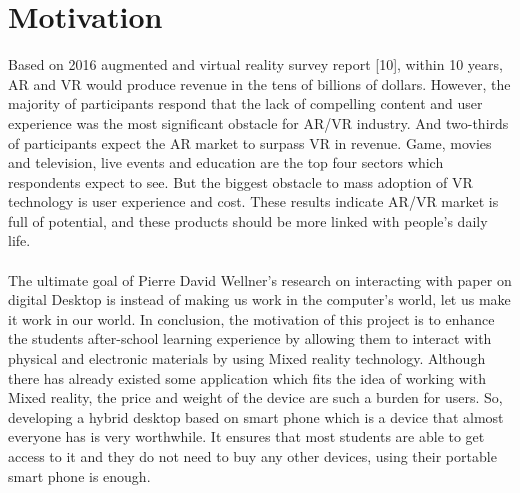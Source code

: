 
\chapter{Motivation} %

\label{Chapter2} %
Based on 2016 augmented and virtual reality survey report [10], within 10 years, AR and VR would produce revenue in the tens of billions of dollars. However, the majority of participants respond that the lack of compelling content and user experience was the most significant obstacle for AR/VR industry. And two-thirds of participants expect the AR market to surpass VR in revenue. Game, movies and television, live events and education are the top four sectors which respondents expect to see. But the biggest obstacle to mass adoption of VR technology is user experience and cost. These results indicate AR/VR market is full of potential, and these products should be more linked with people’s daily life.
\\
\\
The ultimate goal of Pierre David Wellner’s research on interacting with paper on digital Desktop is instead of making us work in the computer’s world, let us make it work in our world. In conclusion, the motivation of this project is to enhance the students after-school learning experience by allowing them to interact with physical and electronic materials by using Mixed reality technology. Although there has already existed some application which fits the idea of working with Mixed reality, the price and weight of the device are such a burden for users. So, developing a hybrid desktop based on smart phone which is a device that almost everyone has is very worthwhile. It ensures that most students are able to get access to it and they do not need to buy any other devices, using their portable smart phone is enough.

